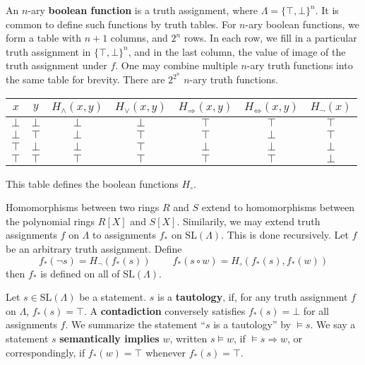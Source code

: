 \begin{example}
    An $n$-ary {\bf boolean function} is a truth assignment, where $\Lambda = \{ \top, \bot \}^n$. It is common to define such functions by truth tables. For $n$-ary boolean functions, we form a table with $n + 1$ columns, and $2^{n}$ rows. In each row, we fill in a particular truth assignment in $\{ \top, \bot \}^n$, and in the last column, the value of image of the truth assignment under $f$. One may combine multiple $n$-ary truth functions into the same table for brevity. There are $2^{2^{n}}$ $n$-ary truth functions.
    \begin{center}
    \begin{tabular}{| c | c | c | c | c | c | c |}
        \hline $x$ & $y$ & $H_\wedge(x,y)$ & $H_\vee(x,y)$ & $H_\Rightarrow(x,y)$ & $H_\Leftrightarrow(x,y)$ & $H_\neg(x)$ \\
        \hline $\bot$ & $\bot$ & $\bot$ & $\bot$ & $\top$ & $\top$ & $\top$ \\
        $\bot$ & $\top$ & $\bot$ & $\top$ & $\top$ & $\bot$ & $\top$ \\
        $\top$ & $\bot$ & $\bot$ & $\top$ & $\bot$ & $\bot$ & $\bot$ \\
        $\top$ & $\top$ & $\top$ & $\top$ & $\top$ & $\top$ & $\bot$ \\
        \hline
    \end{tabular}
    \end{center}
    This table defines the boolean functions $H_\circ$.
\end{example}

Homomorphisms between two rings $R$ and $S$ extend to homomorphisms between the polynomial rings $R[X]$ and $S[X]$. Similarily, we may extend truth assignments $f$ on $\Lambda$ to assignments $f_*$ on $\text{SL}(\Lambda)$. This is done recursively. Let $f$ be an arbitrary truth assignment. Define
%
\[ f_*(\neg s) = H_\neg(f_*(s))\ \ \ \ \ \ \ \ \ \ f_*(s \circ w) = H_\circ(f_*(s), f_*(w)) \]
%
then $f_*$ is defined on all of $\text{SL}(\Lambda)$.

Let $s \in \text{SL}(\Lambda)$ be a statement. $s$ is a {\bf tautology}, if, for any truth assignment $f$ on $\Lambda$, $f_*(s) = \top$. A {\bf contadiction} conversely satisfies $f_*(s) = \bot$ for all assignments $f$. We summarize the statement ``$s$ is a tautology'' by $\vDash s$. We say a statement $s$ {\bf semantically implies} $w$, written $s \vDash w$, if $\vDash s \Rightarrow w$, or correspondingly, if $f_*(w) = \top$ whenever $f_*(s) = \top$.

